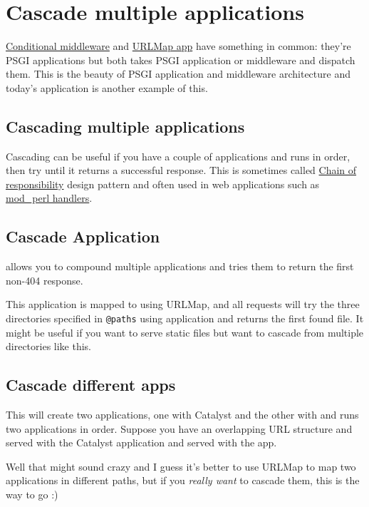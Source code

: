 \chapter{Cascade multiple applications}
\label{day-19-cascade-multiple-applications}

\href{http://advent.plackperl.org/2009/12/day-18-load-middleware-conditionally.html}{Conditional
middleware} and
\href{http://advent.plackperl.org/2009/12/day-12-maps-multiple-apps-with-mount-and-urlmap.html}{URLMap
app} have something in common: they're PSGI applications but both takes
PSGI application or middleware and dispatch them. This is the beauty of
PSGI application and middleware architecture and today's application is
another example of this.

\section{Cascading multiple
applications}\label{cascading-multiple-applications}

Cascading can be useful if you have a couple of applications and runs in
order, then try until it returns a successful response. This is
sometimes called
\href{http://en.wikipedia.org/wiki/Chain-of-responsibility_pattern}{Chain
of responsibility} design pattern and often used in web applications
such as
\href{http://perl.apache.org/docs/2.0/user/handlers/intro.html}{mod\_perl
handlers}.

\section{Cascade Application}\label{cascade-application}

 allows you to compound multiple applications and
tries them to return the first non-404 response.


This application is mapped to  using URLMap, and all
requests will try the three directories specified in \lstinline!@paths!
using  application and returns the first found file. It might
be useful if you want to serve static files but want to cascade from
multiple directories like this.

\section{Cascade different apps}\label{cascade-different-apps}


This will create two applications, one with Catalyst and the other with
 and runs two applications in order. Suppose you have an
overlapping URL structure and  served with the
Catalyst application and  served with the
 app.

Well that might sound crazy and I guess it's better to use URLMap to map
two applications in different paths, but if you \emph{really want} to
cascade them, this is the way to go :)


